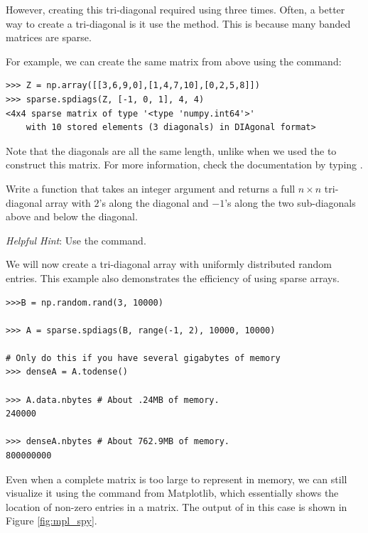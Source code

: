 However, creating this tri-diagonal required using  three times. Often, a better way to create a tri-diagonal is it use the  method. %
This is because many banded matrices are sparse.

For example, we can create the same matrix from above using the command:
\begin{lstlisting}
>>> Z = np.array([[3,6,9,0],[1,4,7,10],[0,2,5,8]])
>>> sparse.spdiags(Z, [-1, 0, 1], 4, 4)
<4x4 sparse matrix of type '<type 'numpy.int64'>'
	with 10 stored elements (3 diagonals) in DIAgonal format>

\end{lstlisting}

Note that the diagonals are all the same length, unlike when we used the  to construct this matrix. For more information, check the documentation by typing .

\begin{problem}
Write a function that takes an integer argument  and returns a full $n\times n$
tri-diagonal array with $2$'s along the diagonal and $-1$'s along
the two sub-diagonals above and below the diagonal.

\emph{Helpful Hint}: Use the  command.
\label{full_tridiag}
\end{problem}

We will now create a tri-diagonal array with uniformly distributed random entries. This example also demonstrates the efficiency of using sparse arrays.

\begin{lstlisting}
>>>B = np.random.rand(3, 10000)

>>> A = sparse.spdiags(B, range(-1, 2), 10000, 10000)

# Only do this if you have several gigabytes of memory
>>> denseA = A.todense() 

>>> A.data.nbytes # About .24MB of memory.
240000

>>> denseA.nbytes # About 762.9MB of memory.
800000000

\end{lstlisting}

Even when a complete matrix is too large to represent in memory,
we can still visualize it using the  command from Matplotlib,
which essentially shows the location of non-zero entries in a matrix.
The output of  in this case is shown in Figure \ref{fig:mpl_spy}.

